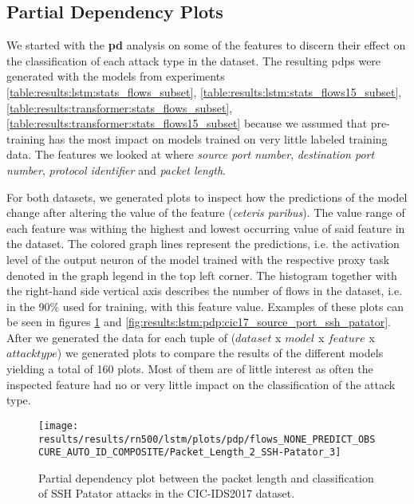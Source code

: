 \FloatBarrier

\subsection{Partial Dependency Plots}

We started with the \textbf{\gls{pd}} analysis on some of the features
to discern their effect on the classification of each attack type in the dataset. 
The resulting \glspl{pdp} were generated with the models from experiments \ref{table:results:lstm:stats_flows_subset},
\ref{table:results:lstm:stats_flows15_subset}, \ref{table:results:transformer:stats_flows_subset}, \ref{table:results:transformer:stats_flows15_subset} because we assumed that pre-training has the most impact on models trained on very little labeled training data. The features we looked at where \textit{source port number}, \textit{destination port number}, \textit{protocol identifier} and \textit{packet length}. \par
For both datasets, we generated plots to inspect how the predictions of the model change after altering the value of the feature (\textit{ceteris paribus}). The value range of each feature was withing the highest and lowest occurring value of said feature in the dataset. The colored graph lines represent the predictions, i.e. the activation level of the output neuron of the model trained with the respective proxy task denoted in the graph legend in the top left corner.
The histogram together with the right-hand side vertical axis describes the number of flows in the dataset, i.e. in the 90\% used for training, with this feature value. 
Examples of these plots can be seen in figures \ref{fig:results:lstm:pdp:cic17_packet_length_ssh_patator} and \ref{fig:results:lstm:pdp:cic17_source_port_ssh_patator}. After we generated the data for each tuple of ($dataset$ x $model$ x $feature$ x $attack type$) we generated plots to compare the results of the different models yielding a total of 160 plots. Most of them are of little interest as often the inspected feature had no or very little impact on the classification of the attack type. \par 

\begin{figure}[h]
	\centering
	\texttt{[image: results/results/rn500/lstm/plots/pdp/flows\_NONE\_PREDICT\_OBSCURE\_AUTO\_ID\_COMPOSITE/Packet\_Length\_2\_SSH-Patator\_3]}
	\caption{Partial dependency plot between the packet length and classification of SSH Patator attacks in the CIC-IDS2017 dataset.}
	\label{fig:results:lstm:pdp:cic17_packet_length_ssh_patator}
\end{figure}

